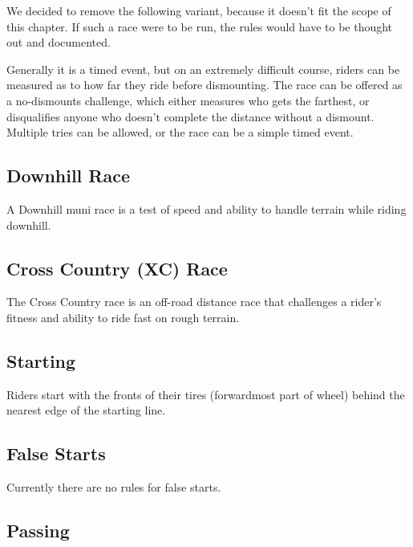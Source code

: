 \begin{comment-2016}
We decided to remove the following variant, because it doesn't fit the
scope of this chapter.  If such a race were to be run,
the rules would have to be thought out and documented.

Generally it is a timed event, but on an extremely difficult course, riders can be measured as to how far they ride before dismounting.
The race can be offered as a no-dismounts challenge, which either measures who gets the farthest, or disqualifies anyone who doesn't complete the distance without a dismount.
Multiple tries can be allowed, or the race can be a simple timed event.
\end{comment-2016}

\subsection{Downhill Race \label{sec:muni_downhill}}

A Downhill muni race is a test of speed and ability to handle terrain while riding downhill.

\subsection{Cross Country (XC) Race\label{sec:muni_xc}}

The Cross Country race is an off-road distance race that challenges a rider's fitness and ability to ride fast on rough terrain.

\subsection{Starting}

Riders start with the fronts of their tires (forwardmost part of wheel) behind the nearest edge of the starting line.

\begin{comment-2016}
\subsection{False Starts}

Currently there are no rules for false starts.
\end{comment-2016}

\subsection{Passing}

